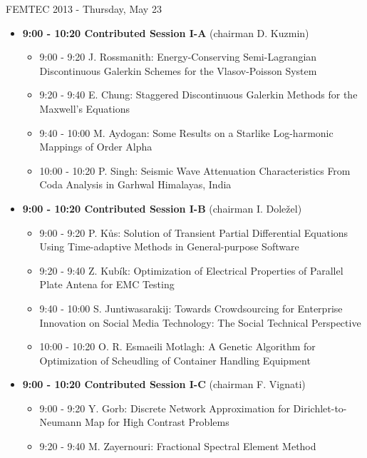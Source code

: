 \documentclass[10pt, A4]{article}%
\begin{document}
\newpage
\newpage

\centerline{\huge FEMTEC 2013 - Thursday, May 23}
\vspace{4mm}

\begin{itemize}    
\item {\bf 9:00 - 10:20 Contributed Session I-A} (chairman D. Kuzmin) 
  \begin{itemize}
    \item 9:00 - 9:20 {J. Rossmanith}: {Energy-Conserving Semi-Lagrangian Discontinuous Galerkin Schemes for the Vlasov-Poisson System} %
    \item 9:20 - 9:40 {E. Chung}: {Staggered Discontinuous Galerkin Methods for the Maxwell's Equations}   
    \item 9:40 - 10:00 {M. Aydogan}: {Some  Results on a Starlike  Log-harmonic Mappings of Order Alpha} %
    \item 10:00 - 10:20  {P. Singh}: {Seismic Wave Attenuation Characteristics  From Coda Analysis in Garhwal Himalayas, India} %
  \end{itemize}
  \item {\bf 9:00 - 10:20 Contributed Session I-B} (chairman I. Doležel) 
  \begin{itemize}
    \item 9:00 - 9:20 {P. Kůs}: {Solution of Transient Partial Differential Equations Using Time-adaptive Methods in General-purpose Software}
    \item 9:20 - 9:40 {Z. Kubík}: {Optimization of Electrical Properties of Parallel Plate Antena for EMC Testing}
    \item 9:40 - 10:00 {S. Juntiwasarakij}: {Towards Crowdsourcing for Enterprise Innovation on Social Media Technology: The Social Technical Perspective} %
    \item 10:00 - 10:20 {O. R. Esmaeili Motlagh}: {A Genetic Algorithm for Optimization of Scheudling of Container Handling Equipment}
  \end{itemize}
    \item {\bf 9:00 - 10:20 Contributed Session I-C} (chairman F. Vignati) 
  \begin{itemize}
    \item 9:00 - 9:20 {Y. Gorb}: {Discrete Network Approximation for Dirichlet-to-Neumann Map for High Contrast Problems} %
    \item 9:20 - 9:40 {M. Zayernouri}: {Fractional Spectral Element Method}

\end{itemize}
\end{itemize}
\end{document}
